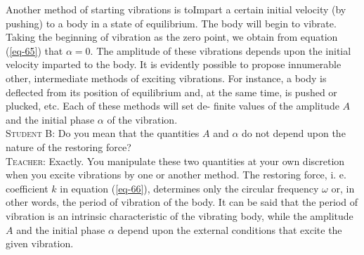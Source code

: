 \documentclass[a4paper,sfsidenotes]{tufte-book}
\begin{document}
Another method of starting vibrations is toImpart a certain initial velocity (by pushing) to a body in a state of equilibrium. The body will begin to vibrate. Taking the beginning of vibration as the zero point, we obtain from equation (\ref{eq-65}) that $\alpha=0$. The amplitude of these vibrations depends
upon the initial velocity imparted to the body. It is evidently possible to propose innumerable other, intermediate methods of exciting vibrations. For instance, a body is deflected from its position of equilibrium and, at the same time, is pushed or plucked, etc. Each of these methods will set de-
finite values of the amplitude $A$ and the initial phase $\alpha$ of the vibration.
\\
\textsc{Student B:} Do you mean that the quantities $A$ and $\alpha$ do not depend upon the nature of the restoring force?
\\
\textsc{Teacher:} Exactly. You manipulate these two quantities at your own discretion when you excite vibrations by one or another method. The restoring force, i. e. coefficient $k$ in equation (\ref{eq-66}), determines only the circular frequency $\omega$ or, in other words, the period of vibration of the body. It can be said that the period of vibration is an intrinsic characteristic of the vibrating body, while the amplitude $A$ and the initial phase $\alpha$ depend upon the external conditions that excite the given vibration.
\end{document}
